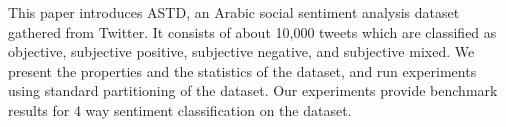 This paper introduces ASTD, an Arabic social sentiment analysis dataset gathered from Twitter. It consists of about 10,000 tweets which are classified as objective, subjective positive, subjective negative, and subjective mixed. We present the properties and the statistics of the dataset, and run experiments using standard partitioning of the dataset. Our experiments provide benchmark results for 4 way sentiment classification on the dataset.
